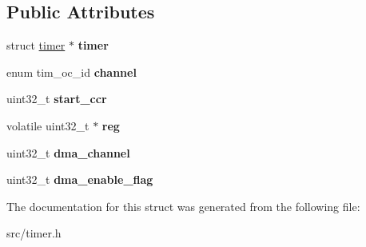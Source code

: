 \subsection*{Public Attributes}
\begin{DoxyCompactItemize}
\item 
\hypertarget{structtimer__ccr__config_af228e92c83395be0dff9f27e6ba7711a}{}struct \hyperlink{structtimer}{timer} $\ast$ {\bfseries timer}\label{structtimer__ccr__config_af228e92c83395be0dff9f27e6ba7711a}

\item 
\hypertarget{structtimer__ccr__config_ae497ec8b539565c6fe34b2849989336a}{}enum tim\+\_\+oc\+\_\+id {\bfseries channel}\label{structtimer__ccr__config_ae497ec8b539565c6fe34b2849989336a}

\item 
\hypertarget{structtimer__ccr__config_a2fb041bdd23dfe84fc7aebb6c51fc149}{}uint32\+\_\+t {\bfseries start\+\_\+ccr}\label{structtimer__ccr__config_a2fb041bdd23dfe84fc7aebb6c51fc149}

\item 
\hypertarget{structtimer__ccr__config_a3876bca410f69a23790a94f8eb9d73f8}{}volatile uint32\+\_\+t $\ast$ {\bfseries reg}\label{structtimer__ccr__config_a3876bca410f69a23790a94f8eb9d73f8}

\item 
\hypertarget{structtimer__ccr__config_a191d86d5e9bc07494477cb7cb39f3a6c}{}uint32\+\_\+t {\bfseries dma\+\_\+channel}\label{structtimer__ccr__config_a191d86d5e9bc07494477cb7cb39f3a6c}

\item 
\hypertarget{structtimer__ccr__config_aa53eb7bbe594fdffff8537f281167e2d}{}uint32\+\_\+t {\bfseries dma\+\_\+enable\+\_\+flag}\label{structtimer__ccr__config_aa53eb7bbe594fdffff8537f281167e2d}

\end{DoxyCompactItemize}


The documentation for this struct was generated from the following file\+:\begin{DoxyCompactItemize}
\item 
src/timer.\+h\end{DoxyCompactItemize}
